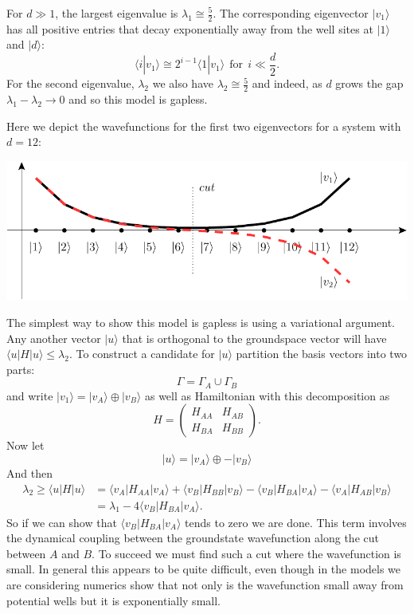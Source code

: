 \documentclass[a4paper,onecolumn,11pt,unpublished]{quantumarticle}
\newcommand{\ket}[1]{|{#1}\rangle}
\newcommand{\bra}[1]{\langle{#1}|}
\newcommand{\braket}[2]{\langle{#1}|{#2}\rangle}
\begin{document}
For $d\gg 1$, the largest
eigenvalue is $\lambda_1 \cong \frac{5}{2}$.
The corresponding eigenvector $\ket{v_1}$
has all positive entries that
decay exponentially away from the well sites
at $\ket{1}$ and $\ket{d}:$
$$
    \braket{i}{v_1} 
    \cong 2^{i-1} \braket{1}{v_1}
    \ \ \mbox{for}\ \ i\ll \frac{d}{2}.
$$
For the second eigenvalue, $\lambda_2$
we also have  $\lambda_2 \cong \frac{5}{2}$
and indeed, as $d$ grows
the gap $\lambda_1 - \lambda_2 \rightarrow 0$
and so this model is gapless.

Here we depict the wavefunctions for
the first two eigenvectors for a system with $d=12:$
\begin{center}
\includegraphics[]{pic-dwell.pdf}
\end{center}
The simplest way to show this model
is gapless is using a variational
argument.
Any another vector $\ket{u}$
that is orthogonal to the groundspace
vector will have $\bra{u}H\ket{u} \le \lambda_2.$
To construct a candidate for $\ket{u}$
partition the
basis vectors into two parts:
$$
    \Gamma = \Gamma_A \cup \Gamma_B
$$
and write $\ket{v_1} = 
\ket{v_A}\oplus\ket{v_B}$
as well as Hamiltonian with this
decomposition as
$$
H = 
\left(\begin{array}{ll}
H_{AA} & H_{AB} \\
H_{BA} & H_{BB}
\end{array}\right).
$$
Now let
$$
    \ket{u} = \ket{v_A} \oplus -\ket{v_B}
$$
And then
\begin{align*}
    \lambda_2 \ge \bra{u}H\ket{u} &= 
\bra{v_A}H_{AA}\ket{v_A} +
\bra{v_B}H_{BB}\ket{v_B} -
\bra{v_B}H_{BA}\ket{v_A} -
\bra{v_A}H_{AB}\ket{v_B} \\
    &= \lambda_1 - 4 \bra{v_B}H_{BA}\ket{v_A}.
\end{align*}
So if we can show that 
$ \bra{v_B}H_{BA}\ket{v_A}$
tends to zero we are done.
This term involves the 
dynamical coupling between the
groundstate wavefunction along
the cut between $A$ and $B$.
To succeed we must find such a cut where
the wavefunction is small. In general
this appears to be quite difficult,
even though in the models we are considering
numerics show that not only is the
wavefunction small away from potential wells
but it is exponentially small.
\end{document}
